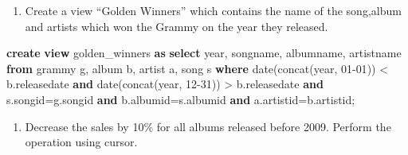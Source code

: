 \documentclass[
]{article}
\newenvironment{Shaded}{}{}
\newcommand{\DataTypeTok}[1]{\textcolor[rgb]{0.56,0.13,0.00}{#1}}
\newcommand{\FunctionTok}[1]{\textcolor[rgb]{0.02,0.16,0.49}{#1}}
\newcommand{\KeywordTok}[1]{\textcolor[rgb]{0.00,0.44,0.13}{\textbf{#1}}}
\newcommand{\NormalTok}[1]{#1}
\newcommand{\OperatorTok}[1]{\textcolor[rgb]{0.40,0.40,0.40}{#1}}
\newcommand{\StringTok}[1]{\textcolor[rgb]{0.25,0.44,0.63}{#1}}
\providecommand{\tightlist}{%
  \setlength{\itemsep}{0pt}\setlength{\parskip}{0pt}}
\begin{document}
\begin{enumerate}
\def\labelenumi{\arabic{enumi}.}
\setcounter{enumi}{6}
\tightlist
\item
  Create a view ``Golden Winners'' which contains the name of the
  song,album and artists which won the Grammy on the year they released.
\end{enumerate}

\begin{Shaded}
\begin{Highlighting}[]
\KeywordTok{create} \KeywordTok{view}\NormalTok{ golden\_winners }\KeywordTok{as} 
   \KeywordTok{select} \DataTypeTok{year}\NormalTok{, songname, albumname, artistname }
      \KeywordTok{from}\NormalTok{ grammy g, album b, artist a, song s }
      \KeywordTok{where} \DataTypeTok{date}\NormalTok{(}\FunctionTok{concat}\NormalTok{(}\DataTypeTok{year}\NormalTok{, }\StringTok{\textquotesingle{}{-}01{-}01\textquotesingle{}}\NormalTok{)) }\OperatorTok{<}\NormalTok{ b.releasedate }
         \KeywordTok{and} \DataTypeTok{date}\NormalTok{(}\FunctionTok{concat}\NormalTok{(}\DataTypeTok{year}\NormalTok{, }\StringTok{\textquotesingle{}{-}12{-}31\textquotesingle{}}\NormalTok{)) }\OperatorTok{>}\NormalTok{ b.releasedate }
         \KeywordTok{and}\NormalTok{ s.songid}\OperatorTok{=}\NormalTok{g.songid }\KeywordTok{and}\NormalTok{ b.albumid}\OperatorTok{=}\NormalTok{s.albumid }
         \KeywordTok{and}\NormalTok{ a.artistid}\OperatorTok{=}\NormalTok{b.artistid;}
\end{Highlighting}
\end{Shaded}

\begin{enumerate}
\def\labelenumi{\arabic{enumi}.}
\setcounter{enumi}{7}
\tightlist
\item
  Decrease the sales by 10\% for all albums released before 2009.
  Perform the operation using cursor.
\end{enumerate}
\end{document}
